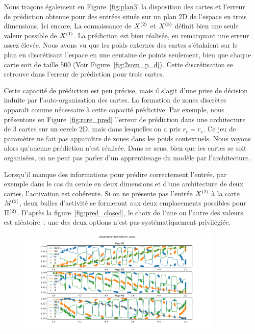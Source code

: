 \documentclass[../main]{subfiles}
\begin{document}
Nous traçons également en Figure~\ref{fig:plan3} la disposition des cartes et l'erreur de prédiction obtenue pour des entrées située sur un plan 2D de l'espace en trois dimensions. Ici encore, La connaissance de $X^{({2})}$ et $X^{({3})}$ définit bien une seule valeur possible de $X^{({1})}$. La prédiction est bien réalisée, en remarquant une erreur assez élevée. 
Nous avons vu que les poids externes des cartes s'étalaient sur le plan en discrétisant l'espace en une centaine de points seulement, bien que chaque carte soit de taille 500 (Voir Figure~\ref{fig:2som_p_d}). 
Cette discrétisation se retrouve dans l'erreur de prédiction pour trois cartes.

Cette capacité de prédiction est peu précise, mais il s'agit d'une prise de décision induite par l'auto-organisation des cartes.
La formation de zones discrètes apparaît comme nécessaire à cette capacité prédictive. Par exemple, nous présentons en Figure~\ref{fig:rcre_pred} l'erreur de prédiction dans une architecture de 3 cartes sur un cercle 2D, mais dans lesquelles on a pris $r_c = r_e$. Ce jeu de paramètre ne fait pas apparaître de zones dans les poids contextuels. Nous voyons alors qu'aucune prédiction n'est réalisée. Dans ce sens, bien que les cartes se soit organisées, on ne peut pas parler d'un apprentissage du modèle par l'architecture.

Lorsqu'il manque des informations pour prédire correctement l'entrée, par exemple dans le cas du cercle en deux dimensions et d'une architecture de deux cartes, l'activation est cohérente. Si on ne présente pas l'entrée $X^{({2})}$ à la carte $M^{({2})}$, deux bulles d'activité se formeront aux deux emplacements possibles pour $\Pi^{({2})}$. D'après la figure~\ref{fig:pred_closed}, le choix de l'une ou l'autre des valeurs est aléatoire~: une des deux options n'est pas systématiquement privilégiée.


\begin{figure}
	\centering\includegraphics[width=0.9\textwidth]{3som_cercle_w.pdf}
	\caption{\label{fig:w_cercle}}
\end{figure}
\end{document}
